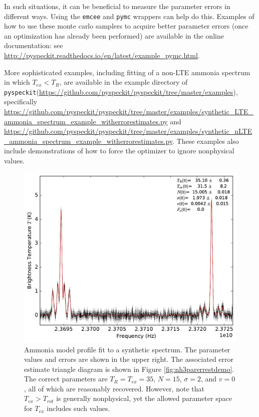 \documentclass[twocolumn]{aastex62}
\newcommand{\pyspeckit}{\texttt{pyspeckit}\xspace}
\begin{document}
In such situations, it can be beneficial to measure the parameter errors
in different ways.  Using the \texttt{emcee} and \texttt{pymc} wrappers
can help do this.  Examples of how to use these monte carlo samplers
to acquire better parameter errors (once an optimization has already
been performed) are available in the online documentation:
see \url{http://pyspeckit.readthedocs.io/en/latest/example_pymc.html}.

More sophisticated examples, including fitting of a non-LTE ammonia spectrum
in which $T_{ex} < T_{R}$, are available in the example directory
of \pyspeckit (\url{https://github.com/pyspeckit/pyspeckit/tree/master/examples}),
specifically
\url{https://github.com/pyspeckit/pyspeckit/tree/master/examples/synthetic_LTE_ammonia_spectrum_example_witherrorestimates.py}
and
\url{https://github.com/pyspeckit/pyspeckit/tree/master/examples/synthetic_nLTE_ammonia_spectrum_example_witherrorestimates.py}.
These examples also include demonstrations of how to force the optimizer to
ignore nonphysical values.


\begin{figure}[!htp]
\includegraphics[scale=1,width=7in]{oned_ammonia_LTE_fit_example.pdf}
\caption{Ammonia model profile fit to a synthetic spectrum.
The parameter values and errors are shown in the upper right.  The associated
error estimate triangle diagram is shown in Figure \ref{fig:nh3parerrestdemo}.
The correct parameters are $T_{R}=T_{ex}=35$, $N=15$, $\sigma=2$, and $v=0$,
all of which are reasonably recovered.  However, note that $T_{ex} > T_{rot}$
is generally nonphysical, yet the allowed parameter space for $T_{ex}$ includes
such values.
}
\label{fig:nh3synthspecdemo}
\end{figure}
\end{document}
